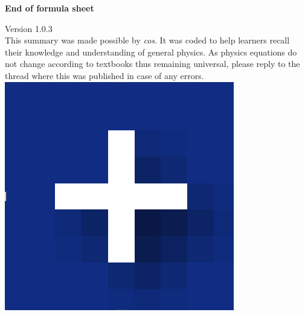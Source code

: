 \documentclass[10pt,landscape]{article}
\begin{document}
\begin{multicols*}{3}
\begin{center}
     {\textbf{End of formula sheet}} \\
\end{center}
Version 1.0.3 \\
This summary was made possible by \textit{cos}. It was coded to help learners recall their knowledge and understanding of general physics. As physics equations do not change according to textbooks thus remaining universal, please reply to the thread where this was published in case of any errors.
\includegraphics[scale=0.05]{blueicon.eps}
\end{multicols*}
\end{document}
